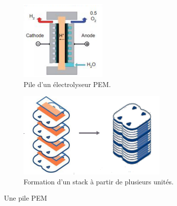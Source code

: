 \documentclass[11pt,french,a4paper]{article}
\begin{document}
\begin{figure}[h]
  \centering
  \begin{subfigure}[b]{0.3\linewidth}
    \includegraphics[width=\linewidth]{image/chap3/Figure 3.2.b-2.png}
    \caption{Pile d'un électrolyseur PEM.}
  \end{subfigure}
  \begin{subfigure}[b]{0.4\linewidth}
    \includegraphics[width=\linewidth]{image/chap3/Figure 3.2.b-3.png}
    \caption{Formation d’un stack à partir de plusieurs unités. }
  \end{subfigure}
  \caption{Une pile PEM }
\end{figure}
\end{document}
